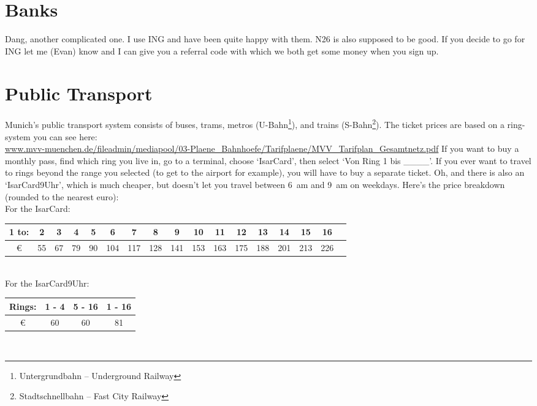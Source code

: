 \documentclass[11pt]{report}
\begin{document}
\section{Banks}
Dang, another complicated one. I use ING and have been quite happy with them. N26 is also supposed to be good. If you decide to go for ING let me (Evan) know and I can give you a referral code with which we both get some money when you sign up.

\section{Public Transport}

Munich's public transport system consists of buses, trams, metros (U-Bahn\footnote{Untergrundbahn -- Underground Railway}), and trains (S-Bahn\footnote{Stadtschnellbahn -- Fast City Railway}). The ticket prices are based on a ring-system you can see here:\\ \href{https://www.mvv-muenchen.de/fileadmin/mediapool/03-Plaene_Bahnhoefe/Tarifplaene/MVV_Tarifplan_Gesamtnetz.pdf}{\tiny www.mvv-muenchen.de/fileadmin/mediapool/03-Plaene\_Bahnhoefe/Tarifplaene/MVV\_Tarifplan\_Gesamtnetz.pdf}
If you want to buy a monthly pass, find which ring you live in, go to a terminal, choose `IsarCard', then select `Von Ring 1 bis \_\_\_\_'. If you ever want to travel to rings beyond the range you selected (to get to the airport for example), you will have to buy a separate ticket. Oh, and there is also an `IsarCard9Uhr', which is much cheaper, but doesn't let you travel between 6~am and 9~am on weekdays. Here's the price breakdown (rounded to the nearest euro):\\

\noindent For the IsarCard:\\
{\tiny \noindent
\begin{tabular}{c||c|c|c|c|c|c|c|c|c|c|c|c|c|c|c|c|}
1 to: & 2 & 3 & 4 & 5 & 6 & 7 & 8 & 9 & 10 & 11 & 12 & 13 & 14 & 15 & 16\\
\hline
\euro{} & 55 & 67 & 79 & 90 & 104 & 117 & 128 & 141 & 153 & 163 & 175 & 188 & 201 & 213 & 226\\
\end{tabular}
}\\

\noindent For the IsarCard9Uhr:\\
{\tiny \noindent
\begin{tabular}{c||c|c|c|}
Rings: & 1 - 4  &  5 -  16 & 1 - 16 \\
\hline
\euro{} & 60 & 60 & 81 \\
\end{tabular}
}\\
\end{document}
